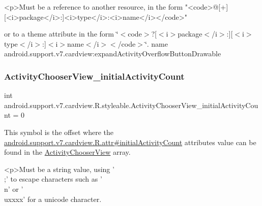\begin{DoxyVerb}      <p>Must be a reference to another resource, in the form "<code>@[+][<i>package</i>:]<i>type</i>:<i>name</i></code>"
\end{DoxyVerb}
 or to a theme attribute in the form \char`\"{}$<$code$>$?\mbox{[}$<$i$>$package$<$/i$>$\+:\mbox{]}\mbox{[}$<$i$>$type$<$/i$>$\+:\mbox{]}$<$i$>$name$<$/i$>$$<$/code$>$\char`\"{}.  name android.\+support.\+v7.\+cardview\+:expand\+Activity\+Overflow\+Button\+Drawable \mbox{\label{classandroid_1_1support_1_1v7_1_1cardview_1_1R_1_1styleable_a3cf4fe79fcc5864408ce4243825dbbb8}} 
\subsubsection{\texorpdfstring{Activity\+Chooser\+View\+\_\+initial\+Activity\+Count}{ActivityChooserView\_initialActivityCount}}
{\footnotesize\ttfamily int android.\+support.\+v7.\+cardview.\+R.\+styleable.\+Activity\+Chooser\+View\+\_\+initial\+Activity\+Count = 0\hspace{0.3cm}{\ttfamily [static]}}

This symbol is the offset where the \hyperlink{classandroid_1_1support_1_1v7_1_1cardview_1_1R_1_1attr_a07815f7ffc1978c1f82a1ae4a03e0c80}{android.\+support.\+v7.\+cardview.\+R.\+attr\#initial\+Activity\+Count} attribute\textquotesingle{}s value can be found in the \hyperlink{classandroid_1_1support_1_1v7_1_1cardview_1_1R_1_1styleable_a97ba41af4dd02474df8be813e34fb7ac}{Activity\+Chooser\+View} array.

\begin{DoxyVerb}      <p>Must be a string value, using '\\;' to escape characters such as '\\n' or '\\uxxxx' for a unicode character.
\end{DoxyVerb}
 

